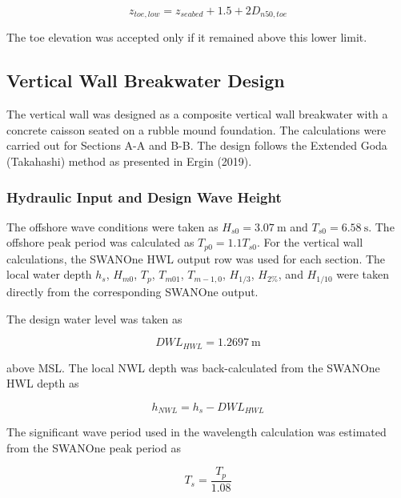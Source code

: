 \documentclass[a4paper, 11pt]{article}
\begin{document}
\begin{equation}
    z_{toe,low}=z_{seabed}+1.5+2D_{n50,toe}
    \label{eq:berm_toe_low}
\end{equation}

The toe elevation was accepted only if it remained above this lower limit.


\subsection{Vertical Wall Breakwater Design}

\hspace*{0.5cm} The vertical wall was designed as a composite vertical wall breakwater with a concrete caisson seated on a rubble mound foundation. The calculations were carried out for Sections A-A and B-B. The design follows the Extended Goda (Takahashi) method as presented in Ergin (2019).

\subsubsection{Hydraulic Input and Design Wave Height}

\hspace*{0.5cm} The offshore wave conditions were taken as \(H_{s0}=3.07~\mathrm{m}\) and \(T_{s0}=6.58~\mathrm{s}\). The offshore peak period was calculated as \(T_{p0}=1.1T_{s0}\). For the vertical wall calculations, the SWANOne HWL output row was used for each section. The local water depth \(h_s\), \(H_{m0}\), \(T_p\), \(T_{m01}\), \(T_{m-1,0}\), \(H_{1/3}\), \(H_{2\%}\), and \(H_{1/10}\) were taken directly from the corresponding SWANOne output.

The design water level was taken as

\begin{equation}
    DWL_{HWL}=1.2697~\mathrm{m}
\end{equation}

above MSL. The local NWL depth was back-calculated from the SWANOne HWL depth as

\begin{equation}
    h_{NWL}=h_s-DWL_{HWL}
\end{equation}

The significant wave period used in the wavelength calculation was estimated from the SWANOne peak period as

\begin{equation}
    T_s=\frac{T_p}{1.08}
\end{equation}
\end{document}
